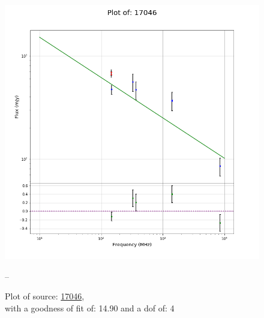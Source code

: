 \documentclass{article}
\begin{document}
\begin{figure}[H]
    \centering
    \begin{minipage}{.5\textwidth}
        \centering
        \includegraphics[scale = 0.35]{KmeulenTrap4P23_1min/1min17046.png}
        \captionsetup{labelformat=empty}
        \caption{Plot of source: \href{http://banana.transientskp.org/r4/vlo_KmeulenTrap4P23/runningcatalog/17046}{17046},\\with a goodness of fit of: 14.90 and a dof of: 4}
        \addtocounter{figure}{-1}
        \label{KmeulenTrap4P23:1min:17046:plot}
    \end{minipage}%
    \begin{minipage}{0.5\textwidth}
        \centering

--
        \end{minipage}
\end{figure}
\end{document}
